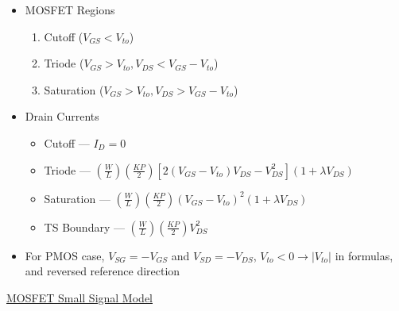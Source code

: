\documentclass[12pt]{article}
\begin{document}
  \begin{multicols}{2}

    \begin{itemize}

      \item MOSFET Regions

        \begin{enumerate}

          \item Cutoff ($V_{GS}<V_{to}$)

          \item Triode ($V_{GS}>V_{to}, V_{DS}<V_{GS}-V_{to}$)

          \item Saturation ($V_{GS}>V_{to}, V_{DS}>V_{GS}-V_{to}$)

        \end{enumerate}

      \item Drain Currents

        \begin{itemize}

          \item Cutoff — $I_D=0$

          \item Triode — $\left( \frac{W}{L} \right)\left( \frac{KP}{2} \right)[2(V_{GS}-V_{to})V_{DS}- V_{DS}^2](1+\lambda V_{DS})$
            
          \item Saturation — $\left( \frac{W}{L} \right)\left( \frac{KP}{2} \right)(V_{GS}-V_{to})^2(1+\lambda V_{DS})$

          \item TS Boundary — $\left( \frac{W}{L} \right)\left( \frac{KP}{2} \right)V_{DS}^2$

        \end{itemize}

      \item For PMOS case, $V_{SG}=-V_{GS}$ and $V_{SD}=-V_{DS}$, $V_{to}<0\to |V_{to}|$ in formulas, and reversed reference direction

    \end{itemize}

  \end{multicols}

  \begin{center}

    \underline{MOSFET Small Signal Model}

  \end{center}
\end{document}
